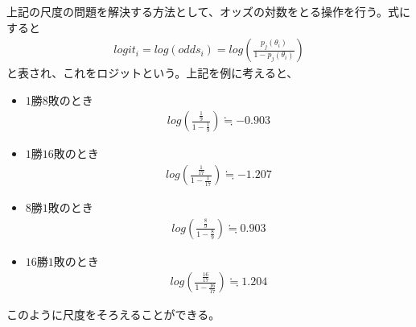 \documentclass[12pt]{jarticle}
\begin{document}
上記の尺度の問題を解決する方法として、オッズの対数をとる操作を行う。式にすると
\begin{eqnarray}
  \label{07}
  \displaystyle logit_i = log(odds_i) = log(\frac{p_j(\theta_i)}{1 - p_j(\theta_i)})
\end{eqnarray}
と表され、これをロジットという。上記を例に考えると、
  \begin{itemize}
  \item $1$勝$8$敗のとき
  \begin{eqnarray}
    \label{08}
    \displaystyle log \left(\frac{\frac{1}{9}}{1 - \frac{1}{9}}\right) \fallingdotseq -0.903
  \end{eqnarray}
  \item $1$勝$16$敗のとき
  \begin{eqnarray}
    \label{09}
    \displaystyle log \left(\frac{\frac{1}{17}}{1 - \frac{1}{17}}\right) \fallingdotseq -1.207
  \end{eqnarray}
  \item $8$勝$1$敗のとき
  \begin{eqnarray}
    \label{10}
    \displaystyle log \left(\frac{\frac{8}{9}}{1 - \frac{8}{9}}\right) \fallingdotseq 0.903
  \end{eqnarray}
  \item $16$勝$1$敗のとき
  \begin{eqnarray}
    \label{11}
    \displaystyle log \left(\frac{\frac{16}{17}}{1 - \frac{16}{17}}\right) \fallingdotseq 1.204
  \end{eqnarray}
\end{itemize}
このように尺度をそろえることができる。
\end{document}
